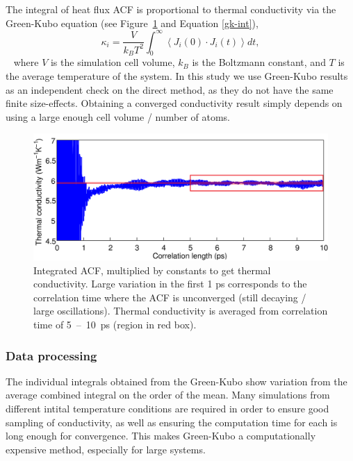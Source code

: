 The integral of heat flux ACF is proportional to thermal conductivity via the Green-Kubo equation (see Figure~\ref{fig:gk_int} and Equation \ref{gk-int}), 
~
\begin{equation}
\kappa_i = \frac{V}{k_{B}T^{2}} \int_{0}^{\infty} \left \langle J_i(0) \cdot  J_i(t) \right \rangle dt ,
\label{gk-int}
\end{equation}
~
where $V$ is the simulation cell volume, $k_B$ is the Boltzmann constant, and $T$ is the average temperature of the system. In this study we use Green-Kubo results as an independent check on the direct method, as they do not have the same finite size-effects. Obtaining a converged conductivity result simply depends on using a large enough cell volume / number of atoms. 

\begin{figure}[h]
\includegraphics[width=\linewidth]{Figures/gk_int.png}
\caption{Integrated ACF, multiplied by constants to get thermal conductivity. Large variation in the first 1 ps corresponds to the correlation time where the ACF is unconverged (still decaying / large oscillations). Thermal conductivity is averaged from correlation time of 5~--~10~ps (region in red box).}
\label{fig:gk_int}
\end{figure}



\subsubsection{Data processing}

The individual integrals obtained from the Green-Kubo show variation from the average combined integral on the order of the mean. Many simulations from different intital temperature conditions are required in order to ensure good sampling of conductivity, as well as ensuring the computation time for each is long enough for convergence. This makes Green-Kubo a computationally expensive method, especially for large systems.

